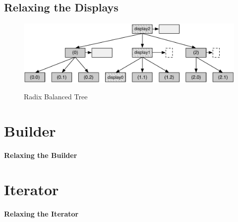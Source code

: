 \subsection{Relaxing the Displays}

\begin{figure}[h!]
  \centering
  \includegraphics[width=\textwidth]{Figures/Balanced_subtrees}
  \label{Balanced_subtrees}
  \caption{Radix Balanced Tree}
\end{figure}




\section{Builder}


\paragraph{Relaxing the Builder}




\section{Iterator}

\paragraph{Relaxing the Iterator}







